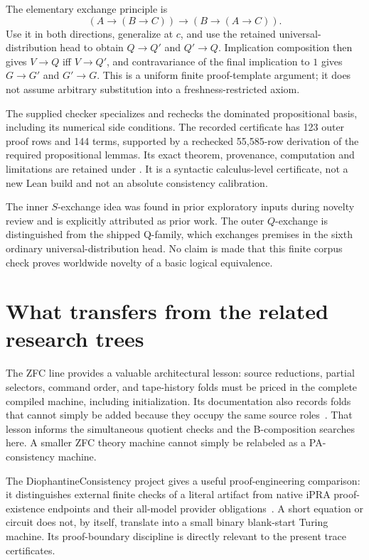 \documentclass[10pt,letterpaper]{article}
\newcommand{\file}[1]{\path{#1}}
\begin{document}
The elementary exchange principle is
\[
 (A\to(B\to C))\to(B\to(A\to C)).
\]
Use it in both directions, generalize at $c$, and use the retained
universal-distribution head to obtain $Q\to Q'$ and $Q'\to Q$.
Implication composition then gives $V\to Q$ iff $V\to Q'$, and
contravariance of the final implication to $1$ gives $G\to G'$ and
$G'\to G$. This is a uniform finite proof-template argument; it does not
assume arbitrary substitution into a freshness-restricted axiom.

The supplied checker specializes and rechecks the dominated propositional
basis, including its numerical side conditions. The recorded certificate
has 123 outer proof rows and 144 terms, supported by a rechecked 55,585-row
derivation of the required propositional lemmas. Its exact theorem,
provenance, computation and limitations are retained under
\file{research/logical/}. It is a syntactic calculus-level certificate,
not a new Lean build and not an absolute consistency calibration.

The inner $S$-exchange idea was found in prior exploratory inputs during
novelty review and is explicitly attributed as prior work. The outer
$Q$-exchange is distinguished from the shipped Q-family, which exchanges
premises in the sixth ordinary universal-distribution head. No claim is
made that this finite corpus check proves worldwide novelty of a basic
logical equivalence.

\section{What transfers from the related research trees}

The ZFC line provides a valuable architectural lesson: source reductions,
partial selectors, command order, and tape-history folds must be priced in
the complete compiled machine, including initialization. Its documentation
also records folds that cannot simply be added because they occupy the same
source roles~\cite{zfc}. That lesson informs the simultaneous quotient
checks and the B-composition searches here. A smaller ZFC theory machine
cannot simply be relabeled as a PA-consistency machine.

The DiophantineConsistency project gives a useful proof-engineering
comparison: it distinguishes external finite checks of a literal artifact
from native iPRA proof-existence endpoints and their all-model provider
obligations~\cite{dio}. A short equation or circuit does not, by itself,
translate into a small binary blank-start Turing machine. Its proof-boundary
discipline is directly relevant to the present trace certificates.
\end{document}

